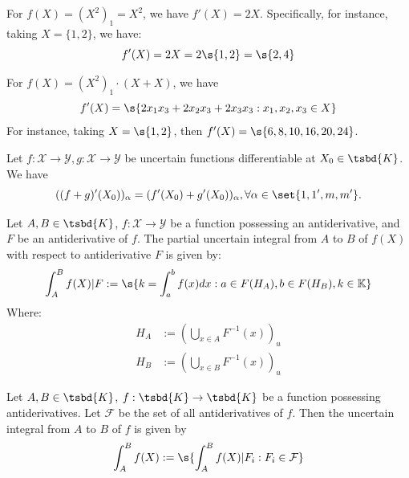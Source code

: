 \begin{example}
	For $f(X) = (X^2)_1 = X^2 $, we have $f'(X) = 2X$. Specifically, for instance, taking $X = \{1,2\}$, we have:
	$$f'(X) = 2X = 2 \s{1,2} = \s{2,4}$$
\end{example}
\begin{example}
	For $f(X)= (X^2)_1\cdot (X+X)$, we have \[f'(X) = \s{2x_1x_3+2x_2x_3+2x_3x_3 : x_1,x_2,x_3 \in X}\]
	For instance, taking $X=\s{1,2}$, then $f'(X) = \s{6, 8, 10, 16, 20, 24}$.
\end{example}
\begin{theorem}
	Let $f : \mathcal{X} \to \mathcal{Y}, g : \mathcal{X} \to \mathcal{Y}$ be uncertain functions differentiable at $X_0 \in \tsbd{K}$. We have \[
		((f+g)'(X_0))_\alpha = (f'(X_0) + g'(X_0))_\alpha, \forall \alpha \in \set{1,1', m,m'}.
	\]
\end{theorem}
\begin{definition}
	Let $A,B \in \tsbd{K}$, $f: \mathcal{X} \to \mathcal{Y}$ be a function possessing an antiderivative, and $F$ be an antiderivative of $f$. The partial uncertain integral from $A$ to $B$ of $f(X)$ with respect to antiderivative $F$ is given by:
	\[
		\int_{A}^{B}{f(X)|F} := \s{k = \int_{a}^{b}f(x)dx : a \in F(H_A), b \in F(H_B), k \in \mathbb{K}}
	\]
	Where:
	\begin{align*}
		H_A &:= \left(\bigcup_{x \in A}{F^{-1}(x)}\right)_u \\
		H_B &:= \left(\bigcup_{x \in B}{F^{-1}(x)}\right)_u
	\end{align*}
\end{definition}
\begin{definition}
	Let $A,B \in \tsbd{K}$, $f: \tsbd{K} \to \tsbd{K}$ be a function possessing antiderivatives. Let $\mathcal{F}$ be the set of all antiderivatives of $f$. Then the uncertain integral from $A$ to $B$ of $f$ is given by \[
	\int_{A}^{B}{f(X)} := \s{\int_{A}^{B}f(X)|F_i : F_i \in \mathcal{F}}
	\]
\end{definition}
